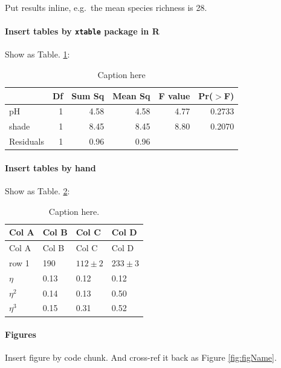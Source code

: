 \documentclass[12pt,]{article}
\let\oldparagraph\paragraph
\renewcommand{\paragraph}[1]{\oldparagraph{#1}\mbox{}}
\begin{document}
Put results inline, e.g.~the mean species richness is 28.

\paragraph{\texorpdfstring{Insert tables by \texttt{xtable} package in
R}{Insert tables by xtable package in R}}\label{insert-tables-by-xtable-package-in-r}

Show as Table. \ref{t:anova}:

\begin{table}[ht]
\centering
\caption{Caption here} 
\label{t:anova}
\begin{tabular}{lrrrrr}
  \toprule
 & Df & Sum Sq & Mean Sq & F value & Pr($>$F) \\ 
  \midrule
pH          & 1 & 4.58 & 4.58 & 4.77 & 0.2733 \\ 
  shade       & 1 & 8.45 & 8.45 & 8.80 & 0.2070 \\ 
  Residuals   & 1 & 0.96 & 0.96 &  &  \\ 
   \bottomrule
\end{tabular}
\end{table}

\paragraph{Insert tables by hand}\label{insert-tables-by-hand}

Show as Table. \ref{tab:byhand}:

\begin{longtable}[]{@{}llll@{}}
\caption{\label{tab:byhand} Caption here.}\tabularnewline
\toprule
Col A & Col B & Col C & Col D\tabularnewline
\midrule
\endfirsthead
\toprule
Col A & Col B & Col C & Col D\tabularnewline
\midrule
\endhead
row 1 & 190 & \(112 \pm 2\) & \(233 \pm 3\)\tabularnewline
\(\eta\) & 0.13 & 0.12 & 0.12\tabularnewline
\(\eta^2\) & 0.14 & 0.13 & 0.50\tabularnewline
\(\eta^3\) & 0.15 & 0.31 & 0.52\tabularnewline
\bottomrule
\end{longtable}

\paragraph{Figures}\label{figures}

Insert figure by code chunk. And cross-ref it back as Figure
\ref{fig:figName}.
\end{document}
